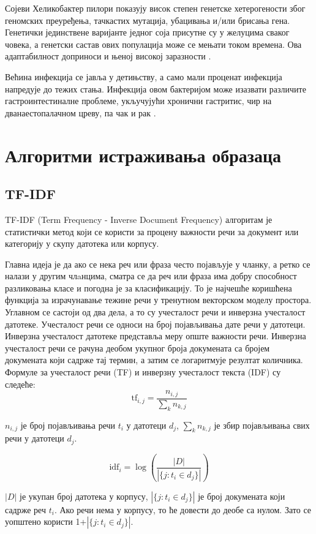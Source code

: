\documentclass[12pt]{article}
\begin{document}
Сојеви Хеликобактер пилори показују висок степен генетске хетерогености због геномских преуређења, тачкастих мутација, убацивања и/или брисања гена. Генетички јединствене варијанте једног соја присутне су у желуцима сваког човека, а генетски састав ових популација може се мењати током времена. Ова адаптабилност доприноси и њеној високој заразности \cite{Noto2012-rr}.

Већина инфекција се јавља у детињству, а само мали проценат инфекција напредује до тежих стања. Инфекција овом бактеријом може изазвати различите гастроинтестиналне проблеме, укључујући хронични гастритис, чир на дванаестопалачном цреву, па чак и рак \cite{2022helicobacter}.

\section{Алгоритми истраживања образаца}

\subsection{TF-IDF}

TF-IDF\cite{Liu2018-oa} (Term Frequency - Inverse Document Frequency) алгоритам
 је
статистички метод који се користи за процену важности речи
за документ или категорију у скупу датотека или корпусу. 

Главна идеја је да ако се нека реч или фраза често појављује у
чланку, а ретко се налази у другим члaнцима, сматра се
да реч или фраза има добру способност разликовања класе
и погодна је за класификацију. То је најчешће коришћена
функција за израчунавање тежине речи у тренутном
векторском моделу простора. Углавном се састоји од
два дела, а то су учесталост речи и инверзна учесталост
датотеке. Учесталост речи се односи на број појављивања
дате речи у датотеци. Инверзна учесталост датотеке представља
меру опште важности речи. Инверзна учесталост речи се рачуна деобом
укупног броја докумената са бројем
докумената који садрже тај термин, а затим се логаритмује
резултат количника. Формуле за учесталост речи (TF) и
инверзну учесталост текста (IDF) су следеће:
$$\mathrm{tf}_{i,j} = \frac{n_{i,j}}{\sum_{k} n_{k,j}}$$

$n_{i,j}$  је број појављивања речи $t_{i}$ у датотеци $d_{j}$,
$\sum_{k} n_{k,j}$ је збир појављивања свих речи у датотеци
$d_{j}$.

$$\mathrm{idf}_i = \log \left(\frac{|D|}{|\{j : t_i \in d_j\}|}\right) $$

$|D|$ је укупан број датотека у корпусу, $|\{j : t_i \in d_j\}|$
је број докумената који садрже реч $t_{i}$. Ако
речи нема у корпусу, то ће довести до деобе са нулом. Зато се
уопштено користи 1+$|\{j : t_i \in d_j\}|$.
\end{document}
